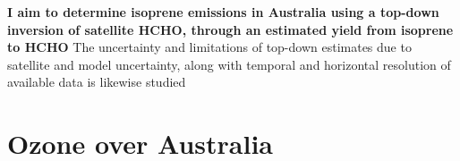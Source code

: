  
\textbf{I aim to determine isoprene emissions in Australia using a top-down inversion of satellite HCHO, through an estimated yield from isoprene to HCHO}
The uncertainty and limitations of top-down estimates due to satellite and model uncertainty, along with temporal and horizontal resolution of available data is likewise studied
 
% 
% 

\section{Ozone over Australia}
\label{Conclusions:ozone}
  
